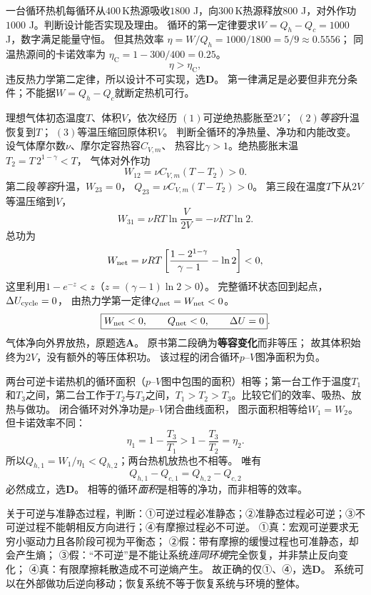 \problemtext 一台循环热机每循环从$400\,\mathrm K$热源吸收$1800$ J，向$300\,\mathrm K$热源释放$800$ J，对外作功$1000$ J。判断设计能否实现及理由。
\workings
循环的第一定律要求$W=Q_h-Q_c=1000$ J，数字满足能量守恒。
但其热效率
$\eta=W/Q_h=1000/1800=5/9\approx0.5556$；
同温热源间的卡诺效率为
$\eta_{\mathrm C}=1-300/400=0.25$。
\[
\boxed{\eta>\eta_{\mathrm C}},
\]
违反热力学第二定律，所以设计不可实现，选\textbf{D}。
\crosscheck 第一律满足是必要但非充分条件；不能据$W=Q_h-Q_c$就断定热机可行。

\problemtext 理想气体初态温度$T$、体积$V$，依次经历
$(1)$可逆绝热膨胀至$2V$；
$(2)$\emph{等容}升温恢复到$T$；
$(3)$等温压缩回原体积$V$。
判断全循环的净热量、净功和内能改变。
\workings
设气体摩尔数$\nu$、摩尔定容热容$C_{V,m}$、
热容比$\gamma>1$。绝热膨胀末温
$T_2=T\,2^{1-\gamma}<T$，
气体对外作功
\[
W_{12}=\nu C_{V,m}(T-T_2)>0.
\]
第二段\emph{等容}升温，$W_{23}=0$，
$Q_{23}=\nu C_{V,m}(T-T_2)>0$。
第三段在温度$T$下从$2V$等温压缩到$V$，
\[
W_{31}=\nu RT\ln\frac{V}{2V}=-\nu RT\ln2.
\]
总功为
\[
W_{\rm net}=\nu RT\left[
\frac{1-2^{1-\gamma}}{\gamma-1}-\ln2
\right]<0,
\]
这里利用$1-e^{-z}<z$（$z=(\gamma-1)\ln2>0$）。
完整循环状态回到起点，$\Delta U_{\rm cycle}=0$，
由热力学第一定律$Q_{\rm net}=W_{\rm net}<0$。
\[
\boxed{W_{\rm net}<0,\qquad Q_{\rm net}<0,\qquad \Delta U=0}.
\]
气体净向外界放热，原题选\textbf{A}。
\crosscheck 原书第二段确为\textbf{等容变化}而非等压；
故其体积始终为$2V$，没有额外的等压体积功。
该过程的闭合循环$p$--$V$图净面积为负。

\problemtext 两台可逆卡诺热机的循环面积（$p$--$V$图中包围的面积）相等；第一台工作于温度$T_1$和$T_3$之间，第二台工作于$T_2$与$T_3$之间，$T_1>T_2>T_3$。比较它们的效率、吸热、放热与做功。
\workings
闭合循环对外净功是$p$--$V$闭合曲线面积，
图示面积相等给$W_1=W_2$。
但卡诺效率不同：
\[
\eta_1=1-\frac{T_3}{T_1}>
1-\frac{T_3}{T_2}=\eta_2.
\]
所以$Q_{h,1}=W_1/\eta_1<Q_{h,2}$；两台热机放热也不相等。
唯有
\[
\boxed{Q_{h,1}-Q_{c,1}=Q_{h,2}-Q_{c,2}}
\]
必然成立，选\textbf{D}。
\crosscheck 相等的循环\emph{面积}是相等的净功，而非相等的效率。

\problemtext 关于可逆与准静态过程，判断：①可逆过程必准静态；②准静态过程必可逆；③不可逆过程不能朝相反方向进行；④有摩擦过程必不可逆。
\workings
①真：宏观可逆要求无穷小驱动力且各阶段可视为平衡态；
②假：带有摩擦的缓慢过程也可准静态，却会产生熵；
③假：“不可逆”是不能让系统\emph{连同环境}完全恢复，并非禁止反向变化；
④真：有限摩擦耗散造成不可逆熵产生。
故正确的仅①、④，选\textbf{D}。
\crosscheck 系统可以在外部做功后逆向移动；恢复系统不等于恢复系统与环境的整体。

